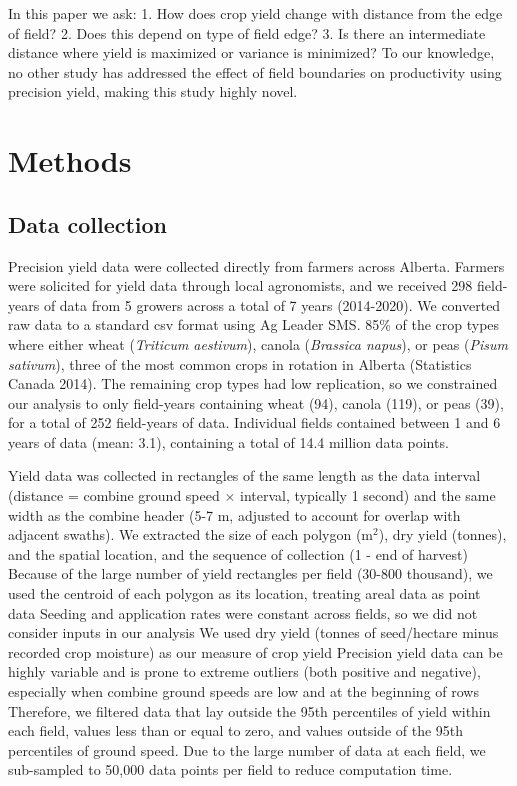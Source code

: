 \documentclass[]{elsarticle} %
\begin{document}
In this paper we ask:
1. How does crop yield change with distance from the edge of field?
2. Does this depend on type of field edge?
3. Is there an intermediate distance where yield is maximized or variance is minimized?
To our knowledge, no other study has addressed the effect of field boundaries on productivity using precision yield, making this study highly novel.

\hypertarget{methods}{%
\section{Methods}\label{methods}}

\hypertarget{data-collection}{%
\subsection{Data collection}\label{data-collection}}

Precision yield data were collected directly from farmers across Alberta.
Farmers were solicited for yield data through local agronomists, and we received 298 field-years of data from 5 growers across a total of 7 years (2014-2020).
We converted raw data to a standard csv format using Ag Leader SMS.
85\% of the crop types where either wheat (\emph{Triticum aestivum}), canola (\emph{Brassica napus}), or peas (\emph{Pisum sativum}), three of the most common crops in rotation in Alberta (Statistics Canada 2014).
The remaining crop types had low replication, so we constrained our analysis to only field-years containing wheat (94), canola (119), or peas (39), for a total of 252 field-years of data.
Individual fields contained between 1 and 6 years of data (mean: 3.1), containing a total of 14.4 million data points.

Yield data was collected in rectangles of the same length as the data interval (distance = combine ground speed \(\times\) interval, typically 1 second) and the same width as the combine header (5-7 m, adjusted to account for overlap with adjacent swaths).
We extracted the size of each polygon (m\(^2\)), dry yield (tonnes), and the spatial location, and the sequence of collection (1 - end of harvest)
Because of the large number of yield rectangles per field (30-800 thousand), we used the centroid of each polygon as its location, treating areal data as point data
Seeding and application rates were constant across fields, so we did not consider inputs in our analysis
We used dry yield (tonnes of seed/hectare minus recorded crop moisture) as our measure of crop yield
Precision yield data can be highly variable and is prone to extreme outliers (both positive and negative), especially when combine ground speeds are low and at the beginning of rows
Therefore, we filtered data that lay outside the 95th percentiles of yield within each field, values less than or equal to zero, and values outside of the 95th percentiles of ground speed.
Due to the large number of data at each field, we sub-sampled to 50,000 data points per field to reduce computation time.
\end{document}
